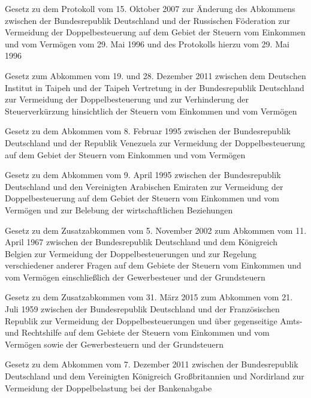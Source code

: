 \item[{DBARUSÄndProtG}] Gesetz zu dem Protokoll vom 15. Oktober 2007 zur Änderung des Abkommens zwischen der Bundesrepublik Deutschland und der Russischen Föderation zur Vermeidung der Doppelbesteuerung auf dem Gebiet der Steuern vom Einkommen und vom Vermögen vom 29. Mai 1996 und des Protokolls hierzu vom 29. Mai 1996

\item[{DBATaipehG}] Gesetz zum Abkommen vom 19. und 28. Dezember 2011 zwischen dem Deutschen Institut in Taipeh und der Taipeh Vertretung in der Bundesrepublik Deutschland zur Vermeidung der Doppelbesteuerung und zur Verhinderung der Steuerverkürzung hinsichtlich der Steuern vom Einkommen und vom Vermögen

\item[{DBAVENG}] Gesetz zu dem Abkommen vom 8. Februar 1995 zwischen der Bundesrepublik Deutschland und der Republik Venezuela zur Vermeidung der Doppelbesteuerung auf dem Gebiet der Steuern vom Einkommen und vom Vermögen

\item[{DBAVerArabEmG}] Gesetz zu dem Abkommen vom 9. April 1995 zwischen der Bundesrepublik Deutschland und den Vereinigten Arabischen Emiraten zur Vermeidung der Doppelbesteuerung auf dem Gebiet der Steuern vom Einkommen und vom Vermögen und zur Belebung der wirtschaftlichen Beziehungen

\item[{DBAZAbkBELG}] Gesetz zu dem Zusatzabkommen vom 5. November 2002 zum Abkommen vom 11. April 1967 zwischen der Bundesrepublik Deutschland und dem Königreich Belgien zur Vermeidung der Doppelbesteuerungen und zur Regelung verschiedener anderer Fragen auf dem Gebiete der Steuern vom Einkommen und vom Vermögen einschließlich der Gewerbesteuer und der Grundsteuern

\item[{DBAZusAbkG-FRA-2015}] Gesetz zu dem Zusatzabkommen vom 31. März 2015 zum Abkommen vom 21. Juli 1959 zwischen der Bundesrepublik Deutschland und der Französischen Republik zur Vermeidung der Doppelbesteuerungen und über gegenseitige Amts- und Rechtshilfe auf dem Gebiete der Steuern vom Einkommen und vom Vermögen sowie der Gewerbesteuern und der Grundsteuern

\item[{DBBankAbkG-GBR}] Gesetz zu dem Abkommen vom 7. Dezember 2011 zwischen der Bundesrepublik Deutschland und dem Vereinigten Königreich Großbritannien und Nordirland zur Vermeidung der Doppelbelastung bei der Bankenabgabe

